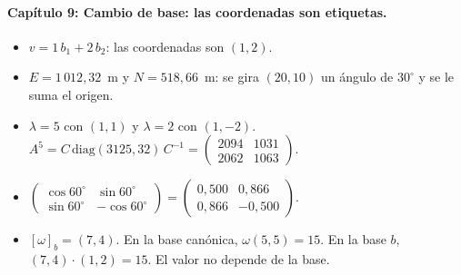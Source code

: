 \paragraph{Capítulo 9: Cambio de base: las coordenadas son etiquetas.}
\begin{itemize}
  \item[\ref{pb:09-1}] \(v=1\,b_1+2\,b_2\): las coordenadas son \((1,2)\).
  \item[\ref{pb:09-2}] \(E=1\,012{,}32\)~m y \(N=518{,}66\)~m: se gira \((20,10)\) un ángulo de \(30^\circ\) y se le suma el origen.
  \item[\ref{pb:09-3}] \(\lambda=5\) con \((1,1)\) y \(\lambda=2\) con \((1,-2)\). \(A^5=C\,\mathrm{diag}(3125,32)\,C^{-1}=\begin{pmatrix}2094&1031\\2062&1063\end{pmatrix}\).
  \item[\ref{pb:09-4}] \(\begin{pmatrix}\cos60^\circ&\sin60^\circ\\\sin60^\circ&-\cos60^\circ\end{pmatrix}=\begin{pmatrix}0{,}500&0{,}866\\0{,}866&-0{,}500\end{pmatrix}\).
  \item[\ref{pb:09-5}] \([\omega]_b=(7,4)\). En la base canónica, \(\omega(5,5)=15\). En la base \(b\), \((7,4)\cdot(1,2)=15\). El valor no depende de la base.
\end{itemize}

